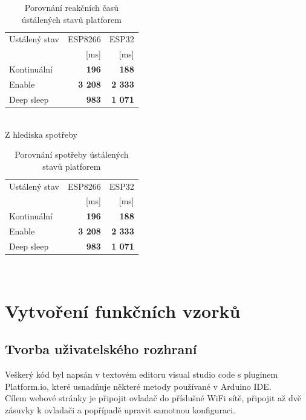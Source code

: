 \documentclass[a4paper, 12pt]{report}
\begin{document}
    \begin{table}[h!]
        \centering
        \caption{Porovnání reakčních časů ústálených stavů platforem}
        \begin{tabular}{||l|r r||}
            \hline
            Ustálený stav & ESP8266        & ESP32          \\
            & [ms]           & [ms]           \\
            \hline
            Kontinuální   & \textbf{196}   & \textbf{188}   \\
            Enable        & \textbf{3 208} & \textbf{2 333} \\
            Deep sleep    & \textbf{983}   & \textbf{1 071} \\
            \hline
        \end{tabular}
        \label{tab:porovnani-klidove-rezimy-cas}
    \end{table}\\
    Z hlediska spotřeby
    \begin{table}[h!]
        \centering
        \caption{Porovnání spotřeby ústálených stavů platforem}
        \begin{tabular}{||l|r r||}
            \hline
            Ustálený stav & ESP8266        & ESP32          \\
            & [ms]           & [ms]           \\
            \hline
            Kontinuální   & \textbf{196}   & \textbf{188}   \\
            Enable        & \textbf{3 208} & \textbf{2 333} \\
            Deep sleep    & \textbf{983}   & \textbf{1 071} \\
            \hline
        \end{tabular}
        \label{tab:porovnani-klidove-rezimy-spotreba}
    \end{table}\\




    \chapter{Vytvoření funkčních vzorků}


    \section{Tvorba uživatelského rozhraní}
    Veškerý kód byl napsán v textovém editoru visual studio code s pluginem Platform.io, které usnadňuje některé metody používané v Arduino IDE.\\
    Cílem webové stránky je připojit ovladač do příslušné WiFi sítě, připojit až dvě zásuvky k ovladači a popřípadě upravit samotnou konfiguraci.
\end{document}
